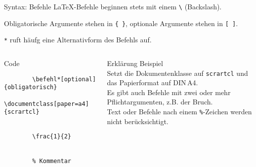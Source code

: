\begin{frame}[fragile]{Syntax: Befehle}
  \LaTeX-Befehle beginnen stets mit einem \verb+\+ (Backslash).

  Obligatorische Argumente stehen in \verb+{ }+, optionale Argumente stehen in \verb+[ ]+.

  \verb+*+ ruft häufg eine Alternativform des Befehls auf.
  \begin{columns}[onlytextwidth, t]
    \begin{column}{0.53\textwidth}
      \begin{block}{Code}
        \begin{lstlisting}
        \befehl*[optional]{obligatorisch}
        \documentclass[paper=a4]{scrartcl}


        \frac{1}{2}


        % Kommentar
        \end{lstlisting}
      \end{block}
    \end{column}
    \begin{column}{0.43\textwidth}
      \begin{block}{Erklärung}
        Beispiel \\
        Setzt die Dokumentenklasse auf \texttt{scrartcl} und das Papierformat auf DIN\,A4. \\
        Es gibt auch Befehle mit zwei oder mehr Pflichtargumenten, z.B. der Bruch. \\
        Text oder Befehle nach einem \verb+%+-Zeichen werden nicht berücksichtigt.
      \end{block}
    \end{column}
  \end{columns}
\end{frame}

